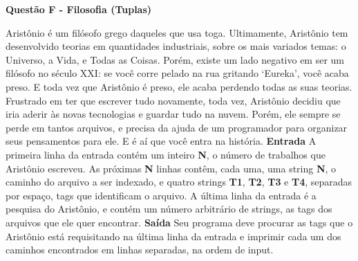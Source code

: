 \documentclass[a4paper, 12pt]{article}
\begin{document}
\newpage %
\begin{center}
\textbf{{\Large Questão F - Filosofia (Tuplas)}}
\end{center}
\vspace{5pt}
Aristônio é um filósofo grego daqueles que usa toga. Ultimamente, Aristônio
tem desenvolvido teorias em quantidades industriais, sobre os mais variados
temas: o Universo, a Vida, e Todas as Coisas. \newline \newline
Porém, existe um lado negativo em ser um filósofo no século XXI: se você
corre pelado na rua gritando ‘Eureka', você acaba preso. E toda vez que
Aristônio é preso, ele acaba perdendo todas as suas teorias. \newline \newline	
Frustrado em ter que escrever tudo novamente, toda vez, Aristônio decidiu
que iria aderir às novas tecnologias e guardar tudo na nuvem. Porém, ele
sempre se perde em tantos arquivos, e precisa da ajuda de um programador
para organizar seus pensamentos para ele. E é aí que você entra na história.
\newline \newline
\textbf{{\large Entrada}} \newline
A primeira linha da entrada contém um inteiro \textbf{N}, o número de trabalhos que
Aristônio escreveu. \newline
As próximas \textbf{N} linhas contêm, cada uma, uma string \textbf{N}, o caminho do arquivo
a ser indexado, e quatro strings \textbf{T1}, \textbf{T2}, \textbf{T3} e \textbf{T4}, separadas por espaço, tags que identificam o arquivo. \newline
A última linha da entrada é a pesquisa do Aristônio, e contém um número
arbitrário de strings, as tags dos arquivos que ele quer encontrar.
\newline \newline
\textbf{{\large Saída}} \newline
Seu programa deve procurar as tags que o Aristônio está requisitando na
última linha da entrada e imprimir cada um dos caminhos encontrados em
linhas separadas, na ordem de input.
\newline
\end{document}
